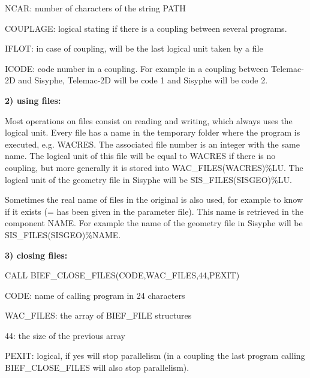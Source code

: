  NCAR: number of characters of the string PATH

 COUPLAGE: logical stating if there is a coupling between several programs.

 IFLOT: in case of coupling, will be the last logical unit taken by a file

 ICODE: code number in a coupling. For example in a coupling between Telemac-2D and Sisyphe, Telemac-2D will be code 1 and Sisyphe will be code 2.

 \textbf{2) using files:}

 Most operations on files consist on reading and writing, which always uses the logical unit. Every file has a name in the temporary folder where the program is executed, e.g. WACRES. The associated file number is an integer with the same name. The logical unit of this file will be equal to WACRES if there is no coupling, but more generally it is stored into WAC\_FILES(WACRES)\%LU. The logical unit of the geometry file in Sisyphe will be SIS\_FILES(SISGEO)\%LU.

 Sometimes the real name of files in the original is also used, for example to know if it exists (= has been given in the parameter file). This name is retrieved in the component NAME. For example the name of the geometry file in Sisyphe will be SIS\_FILES(SISGEO)\%NAME.

 \textbf{3) closing files:}

 CALL BIEF\_CLOSE\_FILES(CODE,WAC\_FILES,44,PEXIT)

 CODE: name of calling program in 24 characters

 WAC\_FILES: the array of BIEF\_FILE structures

 44: the size of the previous array

 PEXIT: logical, if yes will stop parallelism (in a coupling the last program calling BIEF\_CLOSE\_FILES will also stop parallelism).

